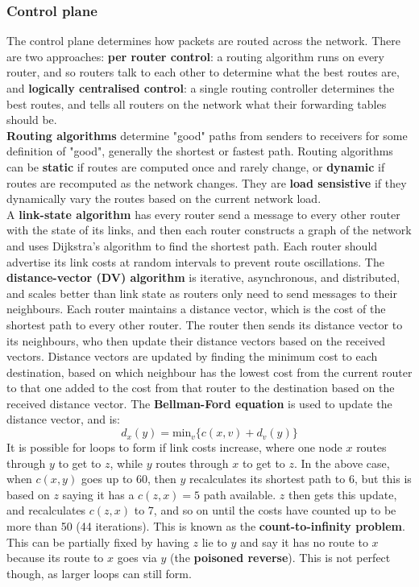 \subsubsection{Control plane}
The control plane determines how packets are routed across the network. There are two approaches: \textbf{per router control}: a routing algorithm runs on every router, and so routers talk to each other to determine what the best routes are, and \textbf{logically centralised control}: a single routing controller determines the best routes, and tells all routers on the network what their forwarding tables should be.\\
\textbf{Routing algorithms} determine "good" paths from senders to receivers for some definition of "good", generally the shortest or fastest path. Routing algorithms can be \textbf{static} if routes are computed once and rarely change, or \textbf{dynamic} if routes are recomputed as the network changes. They are \textbf{load sensistive} if they dynamically vary the routes based on the current network load.\\
A \textbf{link-state algorithm} has every router send a message to every other router with the state of its links, and then each router constructs a graph of the network and uses Dijkstra's algorithm to find the shortest path. Each router should advertise its link costs at random intervals to prevent route oscillations. The \textbf{distance-vector (DV) algorithm} is iterative, asynchronous, and distributed, and scales better than link state as routers only need to send messages to their neighbours. Each router maintains a distance vector, which is the cost of the shortest path to every other router. The router then sends its distance vector to its neighbours, who then update their distance vectors based on the received vectors. Distance vectors are updated by finding the minimum cost to each destination, based on which neighbour has the lowest cost from the current router to that one added to the cost from that router to the destination based on the received distance vector. The \textbf{Bellman-Ford equation} is used to update the distance vector, and is:
\[
	d_x(y)=\text{min}_v\{c(x,v)+d_v(y)\}
\]
It is possible for loops to form if link costs increase, where one node $x$ routes through $y$ to get to $z$, while $y$ routes through $x$ to get to $z$. In the above case, when $c(x,y)$ goes up to 60, then $y$ recalculates its shortest path to 6, but this is based on $z$ saying it has a $c(z,x)=5$ path available. $z$ then gets this update, and recalculates $c(z,x)$ to 7, and so on until the costs have counted up to be more than 50 (44 iterations). This is known as the \textbf{count-to-infinity problem}. This can be partially fixed by having $z$ lie to $y$ and say it has no route to $x$ because its route to $x$ goes via $y$ (the \textbf{poisoned reverse}). This is not perfect though, as larger loops can still form.\\
